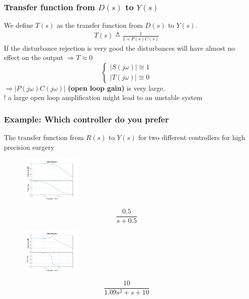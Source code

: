 \begin{frame}
	\frametitle{Transfer function from $D(s)$ to $Y(s)$}
	We define $T(s)$ as the transfer function from $D(s)$ to $Y(s)$.
	\begin{align*}
	T(s) \triangleq \frac{1}{1 + P(s)C(s)}
	\end{align*}
	If the disturbance rejection is very good the disturbances will have almost no effect on the output $\Rightarrow T \approx 0$ \\
	
	\[
	\begin{cases}
		\left| S(j\omega) \right| \cong 1 \\
		\left| T(j\omega) \right| \cong 0
	\end{cases}
	\]
	$\Rightarrow  \left| P(j\omega)C(j\omega) \right|$ \textbf{(open loop gain)} is very large. \\
	
	! a large open loop amplification might lead to an unstable system
	
\end{frame}

\begin{frame}
	\frametitle{Example: Which controller do you prefer}
	The transfer function from $R(s)$ to $Y(s)$ for two different controllers for high precision surgery\\
	\begin{minipage}{0.7\linewidth}
	\begin{figure}
\centering
\includegraphics[width=\columnwidth,height=6em]{smooth-bode}
\label{fig:smooth-bode}
\end{figure}
\end{minipage}
\hfill
\begin{minipage}{0.2\linewidth}
	\[\frac{0.5}{s+0.5}\]
\end{minipage}
\vspace*{-3em}
\begin{minipage}{0.7\linewidth}
\begin{figure}
\centering
\includegraphics[width=\columnwidth,height=6em]{osc-bode}
\label{fig:osc-bode}
\end{figure}
\end{minipage}
\hfill
\begin{minipage}{0.2\linewidth}
	\[\frac{10}{1.09s^2 + s + 10}\]
\end{minipage}
\end{frame}



